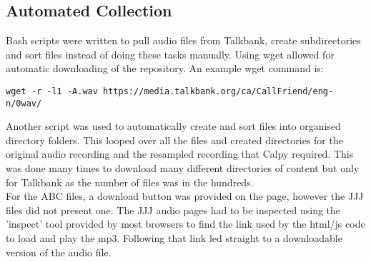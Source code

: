 

\subsection{Automated Collection}
Bash scripts were written to pull audio files from Talkbank, create subdirectories and sort files instead of doing these tasks manually. Using wget allowed for automatic downloading of the repository. An example wget command is:

\begin{verbatim}
wget -r -l1 -A.wav https://media.talkbank.org/ca/CallFriend/eng-n/0wav/
\end{verbatim}

Another script was used to automatically create and sort files into organised directory folders. This looped over all the files and created directories for the original audio recording and the resampled recording that Calpy required. This was done many times to download many different directories of content but only for Talkbank as the number of files was in the hundreds. \\

For the ABC files, a download button was provided on the page, however the JJJ files did not present one. The JJJ audio pages had to be inspected using the 'inspect' tool provided by most browsers to find the link used by the html/js code to load and play the mp3. Following that link led straight to a downloadable version of the audio file.

